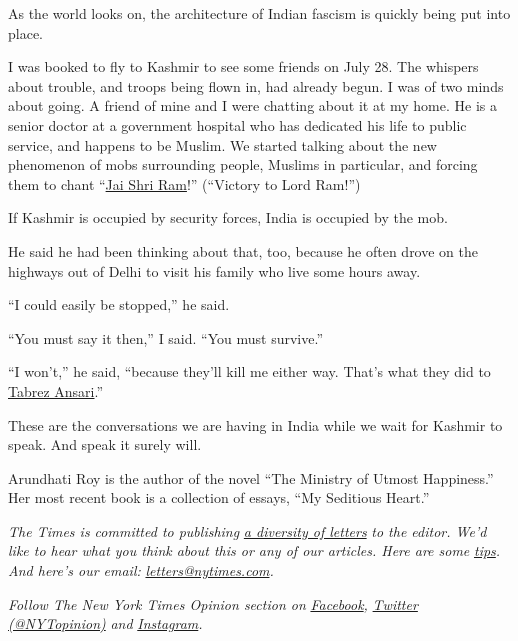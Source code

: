 As the world looks on, the architecture of Indian fascism is quickly
being put into place.

I was booked to fly to Kashmir to see some friends on July 28. The
whispers about trouble, and troops being flown in, had already begun. I
was of two minds about going. A friend of mine and I were chatting about
it at my home. He is a senior doctor at a government hospital who has
dedicated his life to public service, and happens to be Muslim. We
started talking about the new phenomenon of mobs surrounding people,
Muslims in particular, and forcing them to chant
``\href{https://www.bbc.co.uk/news/world-asia-india-48882053}{Jai Shri
Ram}!'' (``Victory to Lord Ram!'')

If Kashmir is occupied by security forces, India is occupied by the mob.

He said he had been thinking about that, too, because he often drove on
the highways out of Delhi to visit his family who live some hours away.

``I could easily be stopped,'' he said.

``You must say it then,'' I said. ``You must survive.''

``I won't,'' he said, ``because they'll kill me either way. That's what
they did to
\href{https://indianexpress.com/article/india/tabrez-ansari-18th-mob-violence-victim-in-jharkhand-in-three-years-5808122/}{Tabrez
Ansari}.''

These are the conversations we are having in India while we wait for
Kashmir to speak. And speak it surely will.

Arundhati Roy is the author of the novel ``The Ministry of Utmost
Happiness.'' Her most recent book is a collection of essays, ``My
Seditious Heart.''

\emph{The Times is committed to publishing}
\href{https://www.nytimes.com/2019/01/31/opinion/letters/letters-to-editor-new-york-times-women.html}{\emph{a
diversity of letters}} \emph{to the editor. We'd like to hear what you
think about this or any of our articles. Here are some}
\href{https://help.nytimes.com/hc/en-us/articles/115014925288-How-to-submit-a-letter-to-the-editor}{\emph{tips}}\emph{.
And here's our email:}
\href{mailto:letters@nytimes.com}{\emph{letters@nytimes.com}}\emph{.}

\emph{Follow The New York Times Opinion section on}
\href{https://www.facebook.com/nytopinion}{\emph{Facebook}}\emph{,}
\href{http://twitter.com/NYTOpinion}{\emph{Twitter (@NYTopinion)}}
\emph{and}
\href{https://www.instagram.com/nytopinion/}{\emph{Instagram}}\emph{.}

